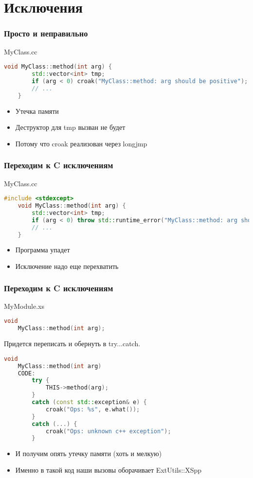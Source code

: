\documentclass[pdflatex,hyperref={unicode=true}]{beamer}
\DeclareRobustCommand{\cpp}{
    \texorpdfstring{\hbox{C\hspace{-0.5ex}\protect\raisebox{0.5ex}{\protect\scalebox{0.67}{++}}}}{C++}
}
\begin{document}
\section{Исключения}

\begin{frame}[fragile]
    \frametitle{Просто и неправильно}
    MyClass.cc
    \begin{lstlisting}[language=C++,style=PerlXS]
    void MyClass::method(int arg) {
        std::vector<int> tmp;
        if (arg < 0) croak("MyClass::method: arg should be positive");
        // ...
    }
    \end{lstlisting}
    \begin{itemize}
        \item \alert{Утечка} памяти
        \item Деструктор для tmp вызван не будет
        \item Потому что croak реализован через longjmp
    \end{itemize}
\end{frame}

\begin{frame}[fragile]
    \frametitle{Переходим к \cpp исключениям}
    MyClass.cc
    \begin{lstlisting}[language=C++,style=PerlXS]
    #include <stdexcept>
    void MyClass::method(int arg) {
        std::vector<int> tmp;
        if (arg < 0) throw std::runtime_error("MyClass::method: arg should be positive");
        // ...
    }
    \end{lstlisting}
    \begin{itemize}
        \item Программа упадет
        \item Исключение надо еще перехватить
    \end{itemize}
\end{frame}

\begin{frame}[fragile]
    \frametitle{Переходим к \cpp исключениям}
    MyModule.xs
    \begin{lstlisting}[language=C++,style=PerlXS]
    void
    MyClass::method(int arg);
    \end{lstlisting}
    Придется переписать и обернуть в try...catch.
    \begin{lstlisting}[language=C++,style=PerlXS]
    void
    MyClass::method(int arg)
    CODE:
        try {
            THIS->method(arg);
        }
        catch (const std::exception& e) {
            croak("Ops: %s", e.what());
        }
        catch (...) {
            croak("Ops: unknown c++ exception");
        }
    \end{lstlisting}
    \begin{itemize}
        \item<2-| alert@2> И получим опять утечку памяти (хоть и мелкую)
        \item<3-> Именно в такой код наши вызовы оборачивает ExtUtils::XSpp
    \end{itemize}
\end{frame}
\end{document}
